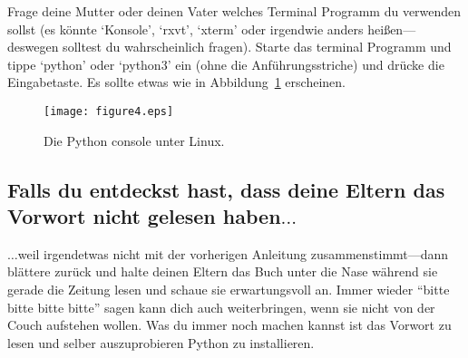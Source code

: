 \begin{LINUX}
Frage deine Mutter oder deinen Vater welches Terminal Programm du verwenden sollst (es könnte `Konsole', `rxvt', `xterm' oder irgendwie anders heißen---deswegen solltest du wahrscheinlich fragen). Starte das terminal Programm und tippe `python' oder `python3' ein (ohne die Anführungsstriche) und drücke die Eingabetaste. Es sollte etwas wie in Abbildung~\ref{fig4} erscheinen.

\begin{figure}
\begin{center}
\texttt{[image: figure4.eps]}
\end{center}
\caption{Die Python console unter Linux.}\label{fig4}
\end{figure}
\end{LINUX}

\subsection*{\color{BrickRed}Falls du entdeckst hast, dass deine Eltern das Vorwort nicht gelesen haben$\ldots$}

$\ldots$weil irgendetwas nicht mit der vorherigen Anleitung zusammenstimmt---dann blättere zurück und halte deinen Eltern das Buch unter die Nase während sie gerade die Zeitung lesen und schaue sie erwartungsvoll an. Immer wieder ``bitte bitte bitte bitte'' sagen kann dich auch weiterbringen, wenn sie nicht von der Couch aufstehen wollen. Was du immer noch machen kannst ist das Vorwort zu lesen und selber auszuprobieren Python zu installieren.


